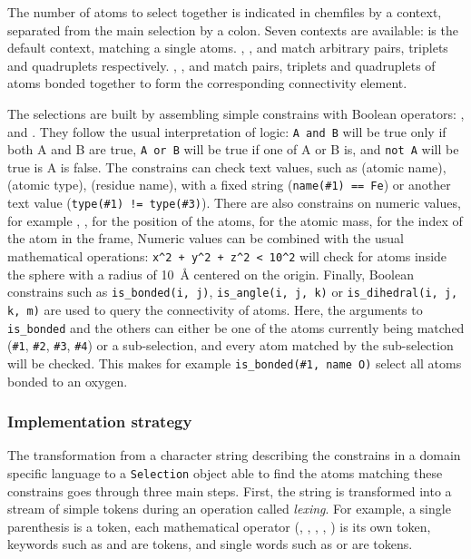 \documentclass[thesis]{subfiles}
\begin{document}
The number of atoms to select together is indicated in chemfiles by a context,
separated from the main selection by a colon. Seven contexts are available:
 is the default context, matching a single atoms. ,
, and  match arbitrary pairs, triplets and quadruplets
respectively. , , and  match pairs,
triplets and quadruplets of atoms bonded together to form the corresponding
connectivity element.

The selections are built by assembling simple constrains with Boolean operators:
,  and . They follow the usual interpretation of
logic: \texttt{A and B} will be true only if both A and B are true, \texttt{A or
B} will be true if one of A or B is, and \texttt{not A} will be true is A is
false. The constrains can check text values, such as  (atomic name),
 (atomic type),  (residue name), with a fixed string
(\texttt{name(\#1) == Fe}) or another text value (\texttt{type(\#1) !=
type(\#3)}). There are also constrains on numeric values, for example ,
,  for the position of the atoms,  for the atomic
mass,  for the index of the atom in the frame, \etc Numeric values
can be combined with the usual mathematical operations: \texttt{x\^{}2 + y\^{}2
+ z\^{}2 < 10\^{}2} will check for atoms inside the sphere with a radius of
\SI{10}{\AA} centered on the origin. Finally, Boolean constrains such as
\texttt{is\_bonded(i, j)}, \texttt{is\_angle(i, j, k)} or
\texttt{is\_dihedral(i, j, k, m)} are used to query the connectivity of atoms.
Here, the arguments to \texttt{is\_bonded} and the others can either be one of
the atoms currently being matched (\texttt{\#1}, \texttt{\#2}, \texttt{\#3},
\texttt{\#4}) or a sub-selection, and every atom matched by the sub-selection
will be checked. This makes for example \texttt{is\_bonded(\#1, name O)} select
all atoms bonded to an oxygen.

\subsubsection{Implementation strategy}

The transformation from a character string describing the constrains in a domain
specific language to a \texttt{Selection} object able to find the atoms matching
these constrains goes through three main steps. First, the string is transformed
into a stream of simple tokens during an operation called \emph{lexing}. For
example, a single parenthesis \token{(} is a token, each mathematical operator
(\token{+}, \token{-}, \token{*}, \token{/}, \token{\textasciicircum}) is its
own token, keywords such as  and  are tokens, and single
words such as  or  are tokens.
\end{document}

